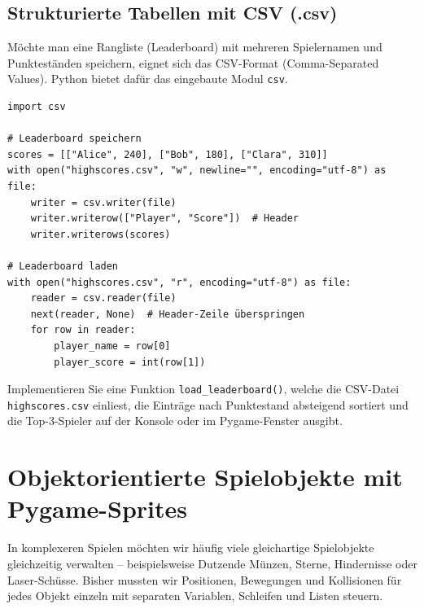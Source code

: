 \subsection{Strukturierte Tabellen mit CSV (.csv)}
Möchte man eine Rangliste (Leaderboard) mit mehreren Spielernamen und Punkteständen speichern, eignet sich das CSV-Format (Comma-Separated Values). Python bietet dafür das eingebaute Modul \lstinline|csv|.

\begin{mydefinition}
\begin{lstlisting}
import csv

# Leaderboard speichern
scores = [["Alice", 240], ["Bob", 180], ["Clara", 310]]
with open("highscores.csv", "w", newline="", encoding="utf-8") as file:
    writer = csv.writer(file)
    writer.writerow(["Player", "Score"])  # Header
    writer.writerows(scores)

# Leaderboard laden
with open("highscores.csv", "r", encoding="utf-8") as file:
    reader = csv.reader(file)
    next(reader, None)  # Header-Zeile überspringen
    for row in reader:
        player_name = row[0]
        player_score = int(row[1])
\end{lstlisting}
\end{mydefinition}

\begin{myexercise}\label{myexercise:HighscoreCsv}
\begin{sloppypar}Implementieren Sie eine Funktion \lstinline|load_leaderboard()|, welche die CSV-Datei \texttt{highscores.csv} einliest, die Einträge nach Punktestand absteigend sortiert und die Top-3-Spieler auf der Konsole oder im Pygame-Fenster ausgibt.\end{sloppypar}
\end{myexercise}

\section{Objektorientierte Spielobjekte mit Pygame-Sprites}
In komplexeren Spielen möchten wir häufig viele gleichartige Spielobjekte gleichzeitig verwalten -- beispielsweise Dutzende Münzen, Sterne, Hindernisse oder Laser-Schüsse. Bisher mussten wir Positionen, Bewegungen und Kollisionen für jedes Objekt einzeln mit separaten Variablen, Schleifen und Listen steuern.

